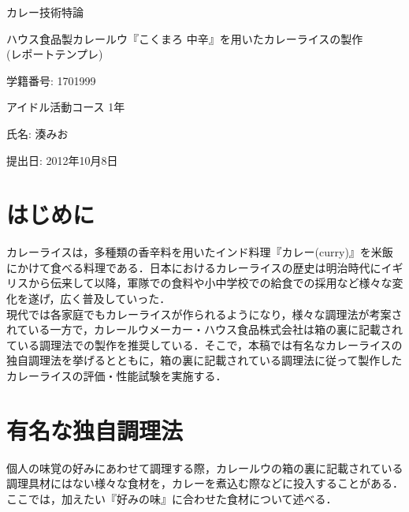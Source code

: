 \documentclass[a4paper, 11pt]{jsarticle}
\begin{document}
\begin{titlepage}
	\begin{center}
		{\Large カレー技術特論}

		\vspace{60truept}

		{\Huge ハウス食品製カレールウ『こくまろ 中辛』を用いたカレーライスの製作\\(レポートテンプレ)}

		\vspace{180truept}

		{\Large 学籍番号: 1701999}

		\vspace{20truept}

		{\Large アイドル活動コース 1年}

		\vspace{20truept}

		{\Large 氏名: 湊みお}

		\vspace{60truept}

		{\Large 提出日: 2012年10月8日}

	\end{center}
\end{titlepage}

\section{はじめに}

カレーライスは，多種類の香辛料を用いたインド料理『カレー(curry)』を米飯にかけて食べる料理である．日本におけるカレーライスの歴史は明治時代にイギリスから伝来して以降，軍隊での食料や小中学校での給食での採用など様々な変化を遂げ，広く普及していった．\\現代では各家庭でもカレーライスが作られるようになり，様々な調理法が考案されている一方で，カレールウメーカー・ハウス食品株式会社は箱の裏に記載されている調理法での製作を推奨している．そこで，本稿では有名なカレーライスの独自調理法を挙げるとともに，箱の裏に記載されている調理法に従って製作したカレーライスの評価・性能試験を実施する．

\section{有名な独自調理法}

個人の味覚の好みにあわせて調理する際，カレールウの箱の裏に記載されている調理具材にはない様々な食材を，カレーを煮込む際などに投入することがある\cite{arrange}．ここでは，加えたい『好みの味』に合わせた食材について述べる．
\end{document}
